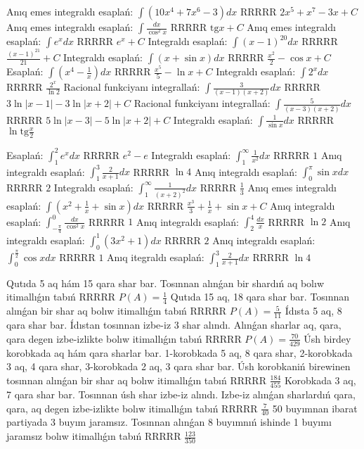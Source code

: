Anıq emes integraldı esaplań: $\displaystyle\int \left( 10x^{4} + 7x^{6} - 3 \right)dx$ RRRRR $2x^5+x^7-3x+C$
Anıq emes integraldı esaplań: $\displaystyle\int \frac{dx}{\cos^{2}x}$ RRRRR $\text{tg} x+C$
Anıq emes integraldı esaplań: $\displaystyle\int e^{x}dx$ RRRRR $e^x+C$
Integraldı esaplań: $\displaystyle\int (x - 1)^{20}dx$ RRRRR $\frac{(x-1)^{21}}{21}+C$
Integraldı esaplań: $\displaystyle\int (x + \sin x)dx$ RRRRR $\frac{x^2}{2} - \cos x +C$
Esaplań: $\displaystyle\int \left( x^{4}-\frac{1}{x} \right)dx$ RRRRR $\frac{x^5}{5} - \ln x + C$
Integraldı esaplań: $\displaystyle\int {2^{x}dx}$ RRRRR $\frac{2^x}{\ln 2}$
Racional funkciyanı integrallań: $\displaystyle\int {\frac{3}{(x - 1)(x + 2)}dx}$ RRRRR $3\ln |x-1| - 3\ln |x+2| + C$
Racional funkciyanı integrallań: $\displaystyle\int {\frac{5}{(x - 3)(x + 2)}dx}$ RRRRR $5\ln |x-3| - 5\ln |x+2| + C$
Integraldı esaplań: $\displaystyle\int {\frac{1}{\sin x}dx}$ RRRRR $\ln \text{tg}\frac{x}{2}$

Esaplań: $\displaystyle\int_{1}^{2}{e^{x}dx}$ RRRRR $e^2 - e$
Integraldı esaplań: $\displaystyle\int_{1}^{\infty}{\frac{1}{x^{2}}dx}$ RRRRR $1$
Anıq integraldı esaplań: $\displaystyle\int_{1}^{3}{\frac{2}{x + 1}dx}$ RRRRR $\ln 4$
Anıq integraldı esaplań: $\displaystyle\int_{0}^{\pi}\sin xdx$ RRRRR $2$
Integraldı esaplań: $\displaystyle\int_{1}^{\infty}{\frac{1}{\left( x + 2 \right)^{2}}dx }$ RRRRR $\frac{1}{3}$
Anıq emes integraldı esaplań: $\displaystyle\int(x^{2}+\frac{1}{x} + \sin x)dx$ RRRRR $\frac{x^3}{3}+\frac{1}{x}+\sin x+C$
Anıq integraldı esaplań: $\displaystyle\int_{-\frac{\pi}{4}}^{0}\frac{dx}{\cos^{2}x}$ RRRRR $1$
Anıq integraldı esaplań: $\displaystyle\int_{2}^{4}\frac{dx}{x}$ RRRRR $\ln 2$
Anıq integraldı esaplań: $\displaystyle\int_{0}^{1}{(3x^{2} + 1)dx}$ RRRRR $2$
Anıq integraldı esaplań: $\displaystyle\int_{0}^{\frac{\pi}{2}}\cos xdx$ RRRRR $1$
Anıq itegraldı esaplań: $\displaystyle\int_{1}^{3}{\frac{2}{x + 1}dx}$ RRRRR $\ln 4$

Qutıda 5 aq hám 15 qara shar bar. Tosınnan alınǵan bir shardıń aq bolıw itimallıǵın tabıń RRRRR $P(A)=\frac{1}{4}$
Qutıda 15 aq, 18 qara shar bar. Tosınnan alınǵan bir shar aq bolıw itimallıǵın tabıń RRRRR $P(A)=\frac{5}{11}$
Ídısta 5 aq, 8 qara shar bar. Ídıstan tosınnan izbe-iz 3 shar alındı. Alınǵan sharlar aq, qara, qara degen izbe-izlikte bolıw itimallıǵın tabıń RRRRR $P(A)=\frac{70}{429}$
Úsh birdey korobkada aq hám qara sharlar bar. 1-korobkada 5 aq, 8 qara shar, 2-korobkada 3 aq, 4 qara shar, 3-korobkada 2 aq, 3 qara shar bar. Úsh korobkaniń birewinen tosınnan alınǵan bir shar aq bolıw itimallıǵın tabıń RRRRR $\frac{184}{455}$
Korobkada 3 aq, 7 qara shar bar. Tosınnan úsh shar izbe-iz alındı. Izbe-iz alınǵan sharlardıń qara, qara, aq degen izbe-izlikte bolıw itimallıǵın tabıń RRRRR $\frac{7}{40}$
50 buyımnan ibarat partiyada 3 buyım jaramsız. Tosınnan alınǵan 8 buyımnıń ishinde 1 buyımı jaramsız bolıw itimallıǵın tabıń RRRRR $\frac{123}{350}$

